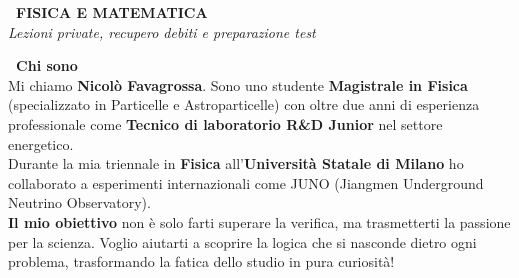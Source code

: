 \documentclass[a4paper,11pt]{article}
\begin{document}
\begin{center}
    {\Huge \textbf{\faRocket\ FISICA E MATEMATICA}}\\[0.2cm]
    {\Large \textit{Lezioni private, recupero debiti e preparazione test}}
\end{center}
\vspace{0.2cm} 

\noindent
\begin{minipage}[t]{0.62\textwidth}
    \vspace{0pt} %
    
    \textcolor{mainblue}{\Large \textbf{\faUserGraduate\ Chi sono}}\\[0.15cm]
    Mi chiamo \textbf{Nicolò Favagrossa}. Sono uno studente \textbf{Magistrale in Fisica} (specializzato in Particelle e Astroparticelle) con oltre due anni di esperienza professionale come \textbf{Tecnico di laboratorio R\&D Junior} nel settore energetico. \\
    Durante la mia triennale in \textbf{Fisica} all'\textbf{Università Statale di Milano} ho collaborato a esperimenti internazionali come JUNO (Jiangmen Underground Neutrino Observatory). \\
    \textbf{Il mio obiettivo} non è solo farti superare la verifica, ma trasmetterti la passione per la scienza. Voglio aiutarti a scoprire la logica che si nasconde dietro ogni problema, trasformando la fatica dello studio in pura curiosità!\\[0.3cm]
    

\end{minipage}
\end{document}
